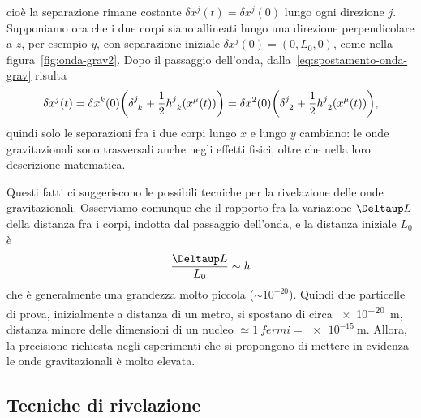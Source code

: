 cioè la separazione rimane costante $\delta x^{j}(t) = \delta x^{j}(0)$ lungo
ogni direzione $j$.  Supponiamo ora che i due corpi siano allineati lungo una
direzione perpendicolare a $z$, per esempio $y$, con separazione iniziale
$\delta x^{j}(0) = (0,L_{0},0)$, come nella figura~\ref{fig:onda-grav2}.  Dopo
il passaggio dell'onda, dalla~\eqref{eq:spostamento-onda-grav} risulta
\begin{equation}
  \delta x^{j}(t) = \delta x^{k}(0) \bigg(\tensor{\delta}{^{j}_{k}} +
  \frac{1}{2}\tensor{h}{^{j}_{k}}(x^{\mu}(t))\bigg) = \delta
  x^{2}(0)\bigg(\tensor{\delta}{^{j}_{2}} +
  \frac{1}{2}\tensor{h}{^{j}_{2}}(x^{\mu}(t))\bigg),
\end{equation}
quindi solo le separazioni fra i due corpi lungo $x$ e lungo $y$ cambiano: le
onde gravitazionali sono trasversali anche negli effetti fisici, oltre che nella
loro descrizione matematica.

Questi fatti ci suggeriscono le possibili tecniche per la rivelazione delle onde
gravitazionali.  Osserviamo comunque che il rapporto fra la variazione $\var L$
della distanza fra i corpi, indotta dal passaggio dell'onda, e la distanza
iniziale $L_{0}$ è
\begin{equation}
  \frac{\var L}{L_{0}} \sim h
\end{equation}
che è generalmente una grandezza molto piccola ($\sim 10^{-20}$).  Quindi due
particelle di prova, inizialmente a distanza di un metro, si spostano di circa
\SI{e-20}{\metre}, distanza minore delle dimensioni di un nucleo $\simeq
\SI{1}{fermi} = \SI{e-15}{\metre}$.  Allora, la precisione richiesta negli
esperimenti che si propongono di mettere in evidenza le onde gravitazionali è
molto elevata.

\subsection{Tecniche di rivelazione}
\label{sec:tecniche-rivelazione}

